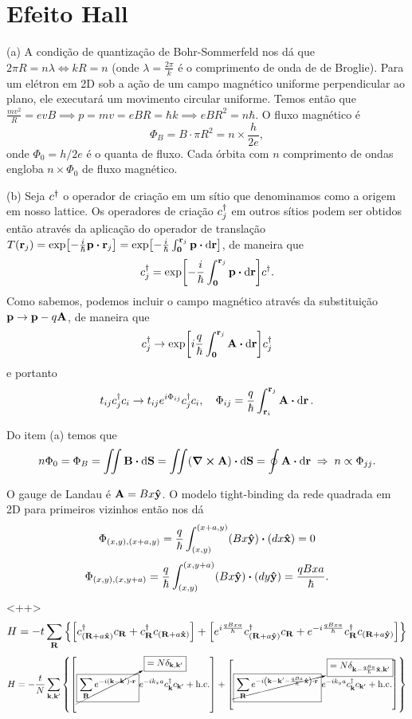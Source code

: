 \documentclass[a4paper,10pt]{article}
\begin{document}
\pagebreak

\section{Efeito Hall}

(a) A condição de quantização de Bohr-Sommerfeld nos dá que $2\pi R = n \lambda \iff k R = n$ (onde $\lambda = \frac{2\pi}{k}$ é o comprimento de onda de de Broglie). Para um elétron em 2D sob a ação de um campo magnético uniforme perpendicular ao plano, ele executará um movimento circular uniforme. Temos então que $\frac{mv^2}{R} = e v B \implies p = mv = e B R = \hbar k \implies e B R^2 = n \hbar$. O fluxo magnético é
$$
\Phi_B = B \cdot \pi R^2 = n \times \frac{h}{2e},
$$
onde $\Phi_0 = h/2e$ é o quanta de fluxo. Cada órbita com $n$ comprimento de ondas engloba $n \times \Phi_0$ de fluxo magnético.

\n

(b) Seja $c^\dagger$ o operador de criação em um sítio que denominamos como a origem em nosso lattice. Os operadores de criação $c_j^\dagger$ em outros sítios podem ser obtidos então através da aplicação do operador de translação $T(\r_j) = \exp[-\frac{i}{\hbar} \p \vdot \r_j] = \exp[-\frac{i}{\hbar} \int_{\0}^{\r_j} \p \vdot \dd{\r}]$, de maneira que
$$
c_j^\d = \exp[-\frac{i}{\hbar} \int_{\0}^{\r_j} \p \vdot \dd{\r}] c^\d.
$$
Como sabemos, podemos incluir o campo magnético através da substituição $\vb{p} \to \vb{p} - q \vb{A}$, de maneira que
$$
c_j^\d \to \exp[i\frac{q}{\hbar} \int_{\0}^{\r_j} \A \vdot \dd{\r}] c_j^\d
$$
e portanto
$$
t_{ij} c_j^\d c_i \to t_{ij} e^{i \Phi_{ij}} c_j^\d c_i, \quad
\Phi_{ij} = \frac{q}{\hbar}\int_{\r_i}^{\r_j} \A \vdot \dd{\r}.
$$

Do item (a) temos que
$$
n \Phi_0 = \Phi_B = \iint \B \vdot \dd{\vb{S}} = \iint (\curl{\A}) \vdot \dd{\vb{S}} = \oint \A \vdot \dd{\r} \implies n \propto \Phi_{jj}.
$$

O gauge de Landau é $\vb{A} = Bx \vu{y}$. O modelo tight-binding da rede quadrada em 2D para primeiros vizinhos então nos dá
$$
\Phi_{(x,y),(x+a,y)} = \frac{q}{\hbar} \int_{(x,y)}^{(x+a,y)} (B x \vu{y}) \vdot (dx \vu{x}) = 0
$$
$$
\Phi_{(x,y),(x,y+a)} = \frac{q}{\hbar} \int_{(x,y)}^{(x,y+a)} (B x \vu{y}) \vdot (dy \vu{y}) = \frac{qBxa}{\hbar}.
$$
<++>
$$
H = -t \sum_{\vb{R}}
\qty{
\qty[c^\dagger_{(\vb{R}+a\vu{x})} c_{\vb{R}} + c_{\vb{R}}^\dagger c_{(\vb{R}+a\vu{x})}] +
\qty[e^{i\frac{qBxa}{\hbar}} c^\dagger_{(\vb{R}+a\vu{y})} c_{\vb{R}} + e^{-i\frac{qBxa}{\hbar}}c_{\vb{R}}^\dagger c_{(\vb{R}+a\vu{y})}]
}
$$
$$
H = -\frac{t}{N} \sum_{\k,\k'}
\qty{
\qty[
\cancelto{\boxed{= N \delta_{\k,\k'}}}{\boxed{\sum_{\R} e^{-i(\k-\k')\vdot\r}}}
e^{-ik_x a} c_{\k}^\d c_{\k'} + \hc] +
\qty[
\cancelto{\boxed{= N \delta_{\k-\frac{qBa}{\hbar}\vu{x},\k'}}}{\boxed{\sum_{\R} e^{-i\qty(\k-\k'-\frac{qBa}{\hbar}\vu{x})\vdot\r}}}
e^{-ik_y a} c_{\k}^\d c_{\k'} + \hc]
}
$$
\end{document}
